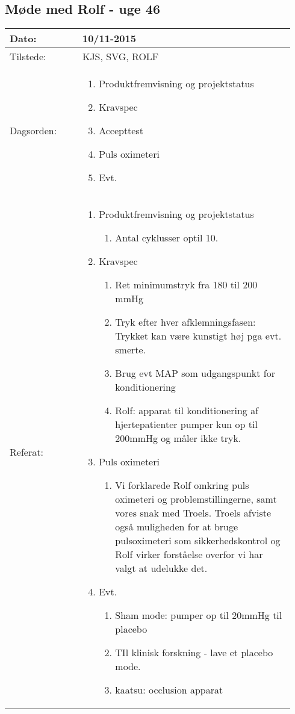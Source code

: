 	\subsection{Møde med Rolf - uge 46} \label{app:rolfuge46}
	\begin{longtable}{|p{0.24\linewidth}|p{0.7\linewidth}|}
		\hline
		Dato: & 10/11-2015\\ \hline
		Tilstede: & KJS, SVG, ROLF\\ \hline
		Dagsorden: &
		\begin{enumerate}
			\item Produktfremvisning og projektstatus
			\item Kravspec
			\item Accepttest 
			\item Puls oximeteri
			\item Evt.
		\end{enumerate}
		\\ \hline
		Referat: & 
		\begin{enumerate}
			\item Produktfremvisning og projektstatus
			\begin{enumerate}
				\item Antal cyklusser optil 10. 
			\end{enumerate}
			\item Kravspec
			\begin{enumerate}
				\item Ret minimumstryk fra 180 til 200 mmHg
				\item Tryk efter hver afklemningsfasen: Trykket kan være kunstigt høj pga evt. smerte.
				\item Brug evt MAP som udgangspunkt for konditionering
				\item Rolf: apparat til konditionering af hjertepatienter pumper kun op til 200mmHg og måler ikke tryk. 
			\end{enumerate}
			\item Puls oximeteri
			\begin{enumerate}
				\item Vi forklarede Rolf omkring puls oximeteri og problemstillingerne, samt vores snak med Troels. Troels afviste også muligheden for at bruge pulsoximeteri som sikkerhedskontrol og Rolf virker forståelse overfor vi har valgt at udelukke det. 
			\end{enumerate}
			\item Evt.
			\begin{enumerate}
				\item Sham mode: pumper op til 20mmHg til placebo 
				\item TIl klinisk forskning - lave et placebo mode. 
				\item kaatsu: occlusion apparat
			\end{enumerate}
		\end{enumerate}
		\\ \hline
	\end{longtable}
	
